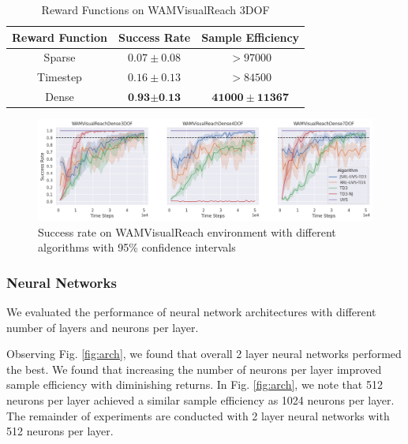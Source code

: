 \documentclass[letterpaper, 10 pt, conference]{ieeeconf}  %
\begin{document}
\begin{table}[h] \caption{Reward Functions on WAMVisualReach 3DOF} \label{tab:reward_type}
    \begin{center}
        \begin{tabular}{|c|c|c|}
            \hline
            Reward Function & Success Rate & Sample Efficiency \\
            \hline
            Sparse & $0.07 \pm 0.08$ & $> 97000$  \\
            \hline
            Timestep & $0.16 \pm 0.13$ & $> 84500$  \\
            \hline
            Dense & $\textbf{0.93} \pm \textbf{0.13}$ & $\mathbf{41000} \pm \mathbf{11367}$ \\
            \hline
        \end{tabular}
    \end{center}
\end{table}

\begin{figure}[thpb]
    \centering
    \includegraphics[width=\linewidth]{successes.alg.timesteps.png}
    \caption{Success rate on WAMVisualReach environment with different algorithms with 95\% confidence intervals}
    \label{figure_results}
\end{figure}

\subsubsection{Neural Networks}

We evaluated the performance of neural network architectures with different
number of layers and neurons per layer.

Observing Fig. \ref{fig:arch}, we found that overall 2 layer neural networks
performed the best. We found that increasing the number of neurons per layer
improved sample efficiency with diminishing returns. In Fig. \ref{fig:arch}, we
note that 512 neurons per layer achieved a similar sample efficiency as 1024
neurons per layer. The remainder of experiments are conducted with 2 layer
neural networks with 512 neurons per layer.
\end{document}
